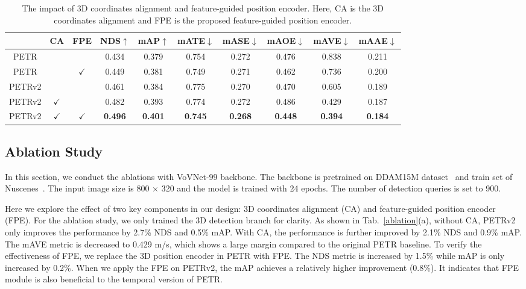 \documentclass[10pt,twocolumn,letterpaper]{article}
\begin{document}
\begin{table*}[t!]
    \begin{center}
\caption{The impact of 3D coordinates alignment and feature-guided position encoder. Here, CA is the 3D coordinates alignment and FPE is the proposed feature-guided position encoder.}
    \label{ablation}
    \setlength{\tabcolsep}{5pt}
\begin{tabular}{c|cc|ccccccc}
        \hline
\quad\quad& \quad CA \quad &\quad FPE \quad\quad& NDS$\uparrow$\quad & mAP$\uparrow$\quad  & mATE$\downarrow$& mASE$\downarrow$& mAOE$\downarrow$& mAVE$\downarrow$ & mAAE$\downarrow$\\
\hline
PETR\quad& & &0.434 &0.379 &0.754 &0.272 &0.476 &0.838 &0.211\\ 
        PETR\quad& &$\checkmark$&0.449 &0.381 &0.749 &0.271 &0.462 &0.736 &0.200\\ 
        \hline
PETRv2\quad& & &0.461 &0.384 &0.775 &0.270 &0.470 &0.605 &0.189\\
PETRv2\quad&\quad$\checkmark$& &0.482 &0.393 &0.774 &0.272 &0.486 &0.429 &0.187 \\
        PETRv2\quad&\quad$\checkmark$ &$\checkmark$ &\textbf{0.496} &\textbf{0.401} &\textbf{0.745} &\textbf{0.268} &\textbf{0.448} &\textbf{0.394} &\textbf{0.184}\\
        \hline
        \end{tabular}






    \label{tab:ablation}
\end{center}
\vspace{-1.0em}
\end{table*}

\subsection{Ablation Study}
In this section, we conduct the ablations with VoVNet-99 backbone. The backbone is pretrained on DDAM15M dataset~\cite{park2021dd3d} and train set of Nuscenes~\cite{caesar2020nuscenes}. The input image size is 800 $\times$ 320 and the model is trained with 24 epochs. The number of detection queries is set to 900.


Here we explore the effect of two key components in our design: 3D coordinates alignment (CA) and feature-guided position encoder (FPE). For the ablation study, we only trained the 3D detection branch for clarity. As shown in Tab.~\ref{ablation}(a), without CA, PETRv2 only improves the performance by 2.7\% NDS and 0.5\% mAP. With CA, the performance is further improved by 2.1\% NDS and 0.9\% mAP. The mAVE metric is decreased to 0.429 m/s, which shows a large margin compared to the original PETR baseline. To verify the effectiveness of FPE, we replace the 3D position encoder in PETR with FPE. The NDS metric is increased by 1.5\% while mAP is only increased by 0.2\%. When we apply the FPE on PETRv2, the mAP achieves a relatively higher improvement (0.8\%). It indicates that FPE module is also beneficial to the temporal version of PETR.
\end{document}
